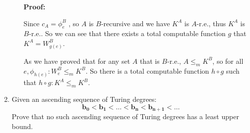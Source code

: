 \documentclass[12pt,a4paper]{article}
\theoremstyle{definition}
\numberwithin{equation}{section}
\numberwithin{figure}{section}
\begin{document}
\begin{enumerate}
\begin{enumerate}
        \textbf{Proof:}
    
Since $c_A = \phi^B_e$ , so $A$ is $B$-recursive and we have $K^A$ is $A$-r.e., thus $K^A$ is $B$-r.e.. So we can see that there exists a total computable function $g$ that $K^A = W^B_{g(e)}$.

As we have proved that for any set $A$ that is $B$-r.e., $A \leq_m K^B$, so for all $e, \phi_{h(e)} : W_e^B \leq_m K^B$. So there is a total computable function $h \circ g$ such that $h \circ g : K^A \leq_m K^B$.

    \end{enumerate}
    

    
	\item Given an ascending sequence of Turing degrees:
\begin{equation*}
\mathbf{b_0}< \mathbf{b_1} < \dots < \mathbf{b_n} < \mathbf{b_{n+1}} <\dots
\end{equation*}
  Prove that no such ascending sequence of Turing degrees has a least upper bound.
\end{enumerate}
\end{document}
